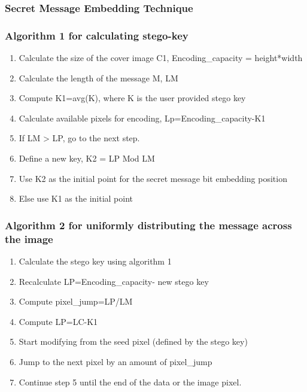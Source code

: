 \documentclass{report}
\begin{document}
\subsubsection{\textbf{\large {Secret Message Embedding Technique}}}
\subsubsection{Algorithm 1 for calculating stego-key}
\begin{enumerate}
    \item Calculate the size of the cover image C1, Encoding\_capacity = height*width
    \item Calculate the length of the  message M, LM
    \item Compute K1=avg(K), where K is the user provided stego key
    \item Calculate available pixels for encoding, Lp=Encoding\_capacity-K1
    \item If LM > LP, go to the next step.
    \item Define a new key, K2 = LP Mod LM
    \item Use K2 as the initial point for the secret message bit embedding position
    \item Else use K1 as the initial point
\end{enumerate}

\subsubsection{Algorithm 2 for uniformly distributing the message across the image}
\begin{enumerate}
    \item Calculate the stego key using algorithm 1
    \item Recalculate LP=Encoding\_capacity-  new stego key
    \item Compute pixel\_jump=LP/LM
    \item Compute LP=LC-K1
    \item Start modifying from the seed pixel (defined by the stego key) 
    \item Jump to the next pixel by an amount of pixel\_jump
    \item Continue step 5 until the end of the data or the image pixel.
\end{enumerate}
\end{document}

